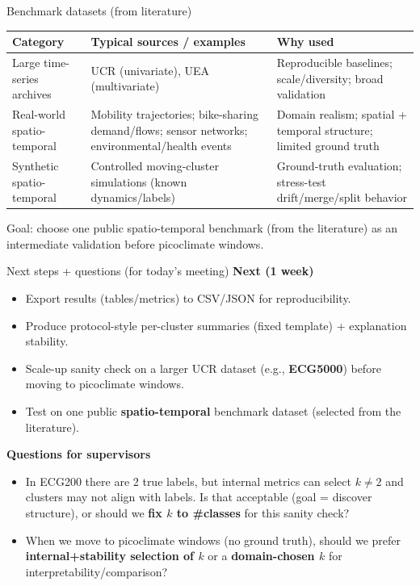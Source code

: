 \documentclass[aspectratio=169]{beamer}
\begin{document}
\begin{frame}{Benchmark datasets (from literature)}
  \footnotesize
  \begin{table}
    \centering
    \renewcommand{\arraystretch}{1.15}
    \begin{tabular}{@{}p{}p{}p{}@{}}
      \toprule
      \textbf{Category} & \textbf{Typical sources / examples} & \textbf{Why used} \\
      \midrule
      Large time-series archives & UCR (univariate), UEA (multivariate) & Reproducible baselines; scale/diversity; broad validation \\
      Real-world spatio-temporal & Mobility trajectories; bike-sharing demand/flows; sensor networks; environmental/health events & Domain realism; spatial + temporal structure; limited ground truth \\
      Synthetic spatio-temporal & Controlled moving-cluster simulations (known dynamics/labels) & Ground-truth evaluation; stress-test drift/merge/split behavior \\
      \bottomrule
    \end{tabular}
  \end{table}

  \vspace{0.25em}
  \footnotesize Goal: choose one public spatio-temporal benchmark (from the literature) as an intermediate validation before picoclimate windows.
\end{frame}

\begin{frame}{Next steps + questions (for today’s meeting)}
  \textbf{Next (1 week)}
  \begin{itemize}
    \item Export results (tables/metrics) to CSV/JSON for reproducibility.
    \item Produce protocol-style per-cluster summaries (fixed template) + explanation stability.
    \item Scale-up sanity check on a larger UCR dataset (e.g., \textbf{ECG5000}) before moving to picoclimate windows.
    \item Test on one public \textbf{spatio-temporal} benchmark dataset (selected from the literature).
  \end{itemize}

  \vspace{0.8em}
  \textbf{Questions for supervisors}
  \begin{itemize}
    \item In ECG200 there are 2 true labels, but internal metrics can select $k\neq 2$ and clusters may not align with labels. Is that acceptable (goal = discover structure), or should we \textbf{fix $k$ to \#classes} for this sanity check?
    \item When we move to picoclimate windows (no ground truth), should we prefer \textbf{internal+stability selection of $k$} or a \textbf{domain-chosen $k$} for interpretability/comparison?
  \end{itemize}
\end{frame}
\end{document}
